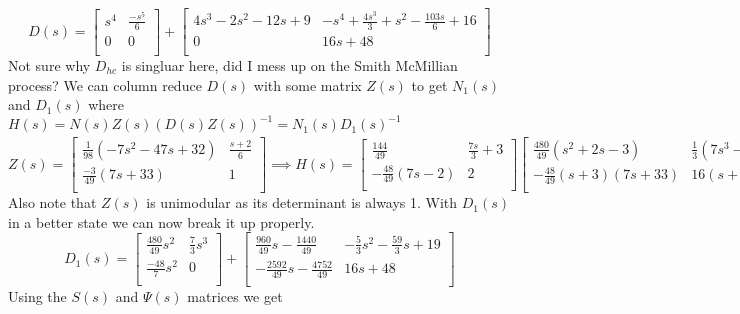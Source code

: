 \documentclass{article}
\begin{document}
$$
D(s) =
\begin{bmatrix}
s^4 & \frac{-s^5}{6} \\
  0 &   0 \\
\end{bmatrix}
+
\begin{bmatrix}
4 s^3-2 s^2-12 s+9 & -s^4+\frac{4 s^3}{3}+s^2-\frac{103 s}{6}+16 \\
0 & 16 s+48 \\
\end{bmatrix}
$$
Not sure why $D_{hc}$ is singluar here, did I mess up on the Smith McMillian process?
We can column reduce $D(s)$ with some matrix $Z(s)$ to get $N_1(s)$ and $D_1(s)$ where
$H(s) = N(s)Z(s)(D(s)Z(s))^{-1} = N_1(s)D_1(s)^{-1}$
$$
Z(s) =
\begin{bmatrix}
\frac{1}{98}(-7s^2-47s +32) & \frac{s+2}{6} \\
\frac{-3}{49}(7s + 33) & 1 \\
\end{bmatrix}
\implies
H(s) =
\begin{bmatrix}
\frac{144}{49} & \frac{7 s}{3}+3 \\
-\frac{48}{49} (7 s-2) & 2 \\
\end{bmatrix}
\begin{bmatrix}
\frac{480}{49} \left(s^2+2 s-3\right) & \frac{1}{3} \left(7 s^3-5 s^2-59 s+57\right) \\
-\frac{48}{49} (s+3) (7 s+33) & 16 (s+3) \\
\end{bmatrix}
^{-1}
$$
Also note that $Z(s)$ is unimodular as its determinant is always 1.
With $D_1(s)$ in a better state we can now break it up properly.
$$
D_1(s) =
\begin{bmatrix}
\frac{480}{49} s^2 & \frac{7}{3}s^3 \\
\frac{-48}{7} s^2 & 0\\
\end{bmatrix}
+
\begin{bmatrix}
\frac{960}{49}s-\frac{1440}{49} & -\frac{5}{3}s^2-\frac{59}{3}s+19 \\
-\frac{2592}{49}s-\frac{4752}{49} & 16 s+48 \\
\end{bmatrix}
$$
Using the $S(s)$ and $\Psi(s)$ matrices we get
\end{document}
